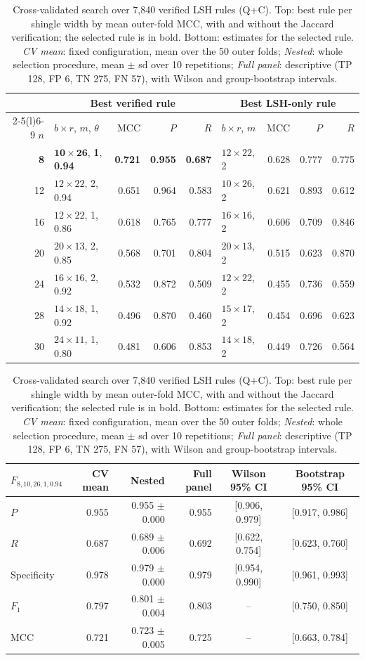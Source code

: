 \begin{table}[t]
\centering
\small
\setlength{\tabcolsep}{5pt}
\begin{tabular}{@{}rlrrrlrrr@{}}
\toprule
 & \multicolumn{4}{c}{Best verified rule} & \multicolumn{4}{c}{Best LSH-only rule} \\
\cmidrule(lr){2-5}\cmidrule(l){6-9}
$n$ & $b{\times}r$, $m$, $\theta$ & MCC & $P$ & $R$ & $b{\times}r$, $m$ & MCC & $P$ & $R$ \\
\midrule
\textbf{8} & $\mathbf{10{\times}26}$, \textbf{1}, \textbf{0.94} & \textbf{0.721} & \textbf{0.955} & \textbf{0.687} & $12{\times}22$, 2 & 0.628 & 0.777 & 0.775 \\
12 & $12{\times}22$, 2, 0.94 & 0.651 & 0.964 & 0.583 & $10{\times}26$, 2 & 0.621 & 0.893 & 0.612 \\
16 & $12{\times}22$, 1, 0.86 & 0.618 & 0.765 & 0.777 & $16{\times}16$, 2 & 0.606 & 0.709 & 0.846 \\
20 & $20{\times}13$, 2, 0.85 & 0.568 & 0.701 & 0.804 & $20{\times}13$, 2 & 0.515 & 0.623 & 0.870 \\
24 & $16{\times}16$, 2, 0.92 & 0.532 & 0.872 & 0.509 & $12{\times}22$, 2 & 0.455 & 0.736 & 0.559 \\
28 & $14{\times}18$, 1, 0.92 & 0.496 & 0.870 & 0.460 & $15{\times}17$, 2 & 0.454 & 0.696 & 0.623 \\
30 & $24{\times}11$, 1, 0.80 & 0.481 & 0.606 & 0.853 & $14{\times}18$, 2 & 0.449 & 0.726 & 0.564 \\
\bottomrule
\end{tabular}

\medskip
\begin{tabular}{@{}lrrrcc@{}}
\toprule
$F_{8,10,26,1,0.94}$ & CV mean & Nested & Full panel & Wilson 95\% CI & Bootstrap 95\% CI \\
\midrule
$P$ & 0.955 & 0.955 $\pm$ 0.000 & 0.955 & [0.906, 0.979] & [0.917, 0.986] \\
$R$ & 0.687 & 0.689 $\pm$ 0.006 & 0.692 & [0.622, 0.754] & [0.623, 0.760] \\
Specificity & 0.978 & 0.979 $\pm$ 0.000 & 0.979 & [0.954, 0.990] & [0.961, 0.993] \\
$F_1$ & 0.797 & 0.801 $\pm$ 0.004 & 0.803 & -- & [0.750, 0.850] \\
MCC & 0.721 & 0.723 $\pm$ 0.005 & 0.725 & -- & [0.663, 0.784] \\
\bottomrule
\end{tabular}
\caption{Cross-validated search over 7,840 verified LSH rules (Q+C). Top:
best rule per shingle width by mean outer-fold MCC, with and without the
Jaccard verification; the selected rule is in bold. Bottom: estimates for the
selected rule. \emph{CV mean}: fixed configuration, mean over the 50 outer
folds; \emph{Nested}: whole selection procedure, mean $\pm$ sd over 10
repetitions; \emph{Full panel}: descriptive (TP 128, FP 6, TN 275, FN 57),
with Wilson and group-bootstrap intervals.}
\label{tab:dedup-search}
\end{table}

